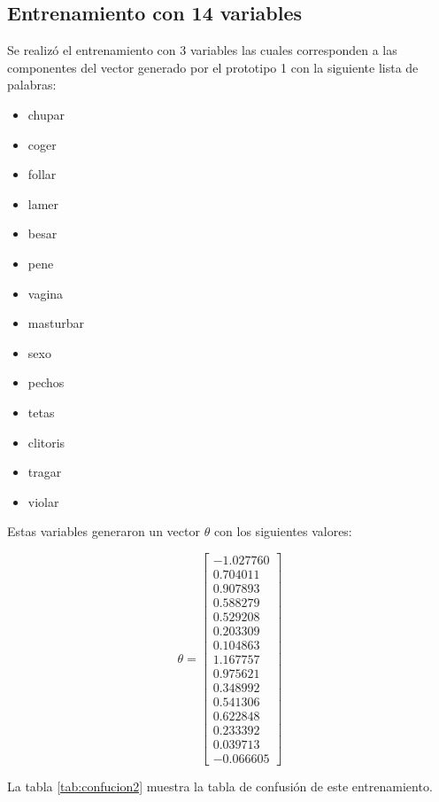 \subsection{Entrenamiento con 14 variables}
Se realiz\'o el entrenamiento con 3 variables las cuales corresponden a las componentes del vector generado por el prototipo 1 con la siguiente lista de palabras:
\begin{itemize}
\item chupar 
\item coger
\item follar
\item lamer
\item besar
\item pene 
\item vagina
\item masturbar
\item sexo
\item pechos
\item tetas
\item clitoris
\item tragar
\item violar
\end{itemize}

Estas variables generaron un vector $\theta$ con los siguientes valores:

\begin{equation}
\theta = 
\begin{bmatrix}

-1.027760 \\
 0.704011 \\
 0.907893 \\
 0.588279 \\
 0.529208 \\
 0.203309 \\
 0.104863 \\
 1.167757 \\
 0.975621 \\
 0.348992 \\
 0.541306 \\
 0.622848 \\
 0.233392 \\
 0.039713 \\
 -0.066605
 
\end{bmatrix}
\end{equation}

La tabla \ref{tab:confucion2} muestra la tabla de confusi\'on de este entrenamiento.


